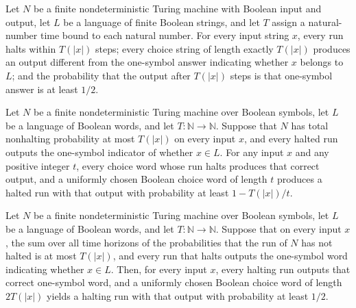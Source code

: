 \begin{definition}
\label{Turing.FinNDTM.AbortDecidesInTime}
\leanok
{}
Let $N$ be a finite nondeterministic Turing machine with Boolean input and output, let
$L$ be a language of finite Boolean strings, and let $T$ assign a natural-number time
bound to each natural number. For every input string $x$, every run halts within
$T(|x|)$ steps; every choice string of length exactly $T(|x|)$ produces an output
different from the one-symbol answer indicating whether $x$ belongs to $L$; and the
probability that the output after $T(|x|)$ steps is that one-symbol answer is at least
$1/2$.
\end{definition}

\begin{theorem}
\label{Turing.FinNDTM.ZDecidesInTime.truncate}
\leanok
{}
Let $N$ be a finite nondeterministic Turing machine over Boolean symbols, let $L$ be a
language of Boolean words, and let $T\colon\mathbb{N}\to\mathbb{N}$. Suppose that $N$
has total nonhalting probability at most $T(|x|)$ on every input $x$, and every halted
run outputs the one-symbol indicator of whether $x\in L$. For any input $x$ and any
positive integer $t$, every choice word whose run halts produces that correct output,
and a uniformly chosen Boolean choice word of length $t$ produces a halted run with that
output with probability at least $1-T(|x|)/t$.
\end{theorem}

\begin{theorem}
\label{Turing.FinNDTM.ZDecidesInTime.abort}
\leanok
{}
Let $N$ be a finite nondeterministic Turing machine over Boolean symbols, let $L$ be a
language of Boolean words, and let $T\colon\mathbb{N}\to\mathbb{N}$. Suppose that on
every input $x$, the sum over all time horizons of the probabilities that the run of $N$
has not halted is at most $T(|x|)$, and every run that halts outputs the one-symbol word
indicating whether $x\in L$. Then, for every input $x$, every halting run outputs that
correct one-symbol word, and a uniformly chosen Boolean choice word of length $2T(|x|)$
yields a halting run with that output with probability at least $1/2$.
\end{theorem}

